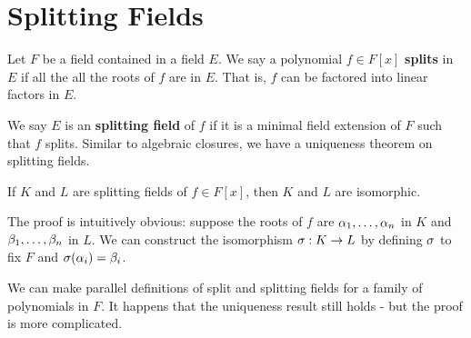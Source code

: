 \section{Splitting Fields}
Let $F$ be a field contained in a field $E$. We say a polynomial $f \in F[x]$ \textbf{splits} in $E$ if all the all the roots of $f$ are in $E$. That is, $f$ can be factored into linear factors in $E$.

We say $E$ is an \textbf{splitting field} of $f$ if it is a minimal field extension of $F$ such that $f$ splits. Similar to algebraic closures, we have a uniqueness theorem on splitting fields.
\begin{center}
    If $K$ and $L$ are splitting fields of $f \in F[x]$, then $K$ and $L$ are isomorphic.
\end{center}
The proof is intuitively obvious: suppose the roots of $f$ are $\alpha_1, \dots, \alpha_n$ in $K$ and $\beta_1, \dots, \beta_n$ in $L$. We can construct the isomorphism $\sigma: K \rightarrow L$ by defining $\sigma$ to fix $F$ and $\sigma(\alpha_i) = \beta_i$.

We can make parallel definitions of split and splitting fields for a family of polynomials in $F$. It happens that the uniqueness result still holds - but the proof is more complicated.